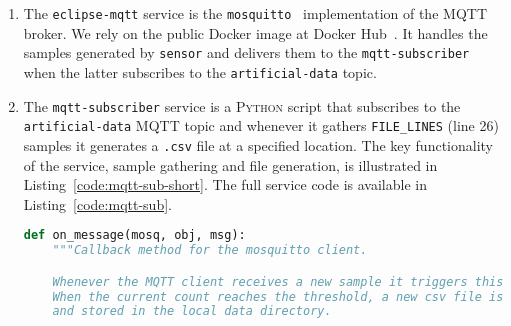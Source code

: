 \begin{enumerate}
\begin{lstlisting}[language=Python,caption={Snippet illustrating the artificial data generation in the \texttt{sensor} service.},label=code:sensor-data-gen]
    Parameters
    ----------
    sample_rate : float
        How many samples are generated per second
    """
    killer = Killer()
    global CL_ID
    past_ts = time.time()
    while 1:
        value = ""
        # First we generate <sample_rate> timestamps in one second
        tstamps = [i for i in random.uniform(low=time.time(),
                                             high=time.time() + 1,
                                             size=(sample_rate))]
        tstamps.sort()
        # Second we compute the intervals between them
        for i in tstamps:
            tmp = datetime.fromtimestamp(i).strftime('%Y-%m-%d %H:%M:%S')
            value += tmp+','+str(int((i - past_ts) * 1e6))+'\n'
            past_ts = i
        publish.single("artificial-data-{}".format(CL_ID), value)
        time.sleep(1)
        if killer.kill_now:
            print("Exiting gracefully!")
            break
\end{lstlisting}
    \item The \texttt{eclipse-mqtt} service is the \texttt{mosquitto}~\cite{mqtt-eclipse} implementation of the \textsc{MQTT} broker. We rely on the public Docker image at Docker Hub~\cite{mqtt-image}. It handles the samples generated by \texttt{sensor} and delivers them to the \texttt{mqtt-subscriber} when the latter subscribes to the \texttt{artificial-data} topic.
    \item The \texttt{mqtt-subscriber} service is a \textsc{Python} script that subscribes to the \texttt{artificial-data} \textsc{MQTT} topic and whenever it gathers \texttt{FILE\_LINES} (line 26) samples it generates a \texttt{.csv} file at a specified location. The key functionality of the service, sample gathering and file generation, is illustrated in Listing~\ref{code:mqtt-sub-short}. The full service code is available in Listing~\ref{code:mqtt-sub}.
\begin{lstlisting}[language=Python,caption={Snippet of the data gathering and file generation in the \texttt{mqtt-subscriber} service.},label=code:mqtt-sub-short]
def on_message(mosq, obj, msg):
    """Callback method for the mosquitto client.

    Whenever the MQTT client receives a new sample it triggers this method.
    When the current count reaches the threshold, a new csv file is generated
    and stored in the local data directory.


\end{lstlisting}
\end{enumerate}
